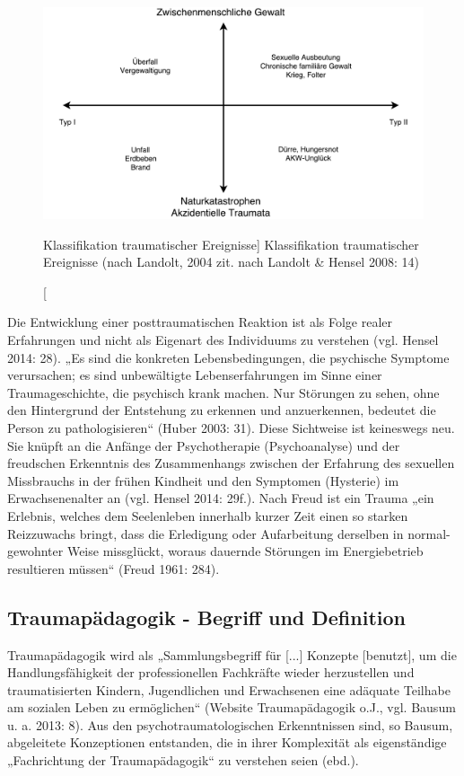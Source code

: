 \begin{figure}[h]
  \centering
  \includegraphics[scale=0.5]{abbildung1}
  \caption
      [Klassifikation traumatischer Ereignisse]
      {Klassifikation traumatischer Ereignisse (nach Landolt, 2004 zit. nach Landolt \& Hensel 2008: 14)}
\end{figure}

Die Entwicklung einer posttraumatischen Reaktion ist als Folge realer Erfahrungen und nicht als Eigenart des Individuums zu verstehen (vgl. Hensel 2014: 28). „Es sind die konkreten Lebensbedingungen, die psychische Symptome verursachen; es sind unbewältigte Lebenserfahrungen im Sinne einer Traumageschichte, die psychisch krank machen. Nur Störungen zu sehen, ohne den Hintergrund der Entstehung zu erkennen und anzuerkennen, bedeutet die Person zu pathologisieren“ (Huber 2003: 31). Diese Sichtweise ist keineswegs neu. Sie knüpft an die Anfänge der Psychotherapie (Psychoanalyse) und der freudschen Erkenntnis des Zusammenhangs zwischen der Erfahrung des sexuellen Missbrauchs in der frühen Kindheit und den Symptomen (Hysterie) im Erwachsenenalter an (vgl. Hensel 2014: 29f.). Nach Freud ist ein Trauma „ein Erlebnis, welches dem Seelenleben innerhalb kurzer Zeit einen so starken Reizzuwachs bringt, dass die Erledigung oder Aufarbeitung derselben in normal-gewohnter Weise missglückt, woraus dauernde Störungen im Energiebetrieb resultieren müssen“ (Freud 1961: 284). 

\subsection{Traumapädagogik - Begriff und Definition}
Traumapädagogik wird als „Sammlungsbegriff für [...] Konzepte [benutzt], um die Handlungsfähigkeit der professionellen Fachkräfte wieder herzustellen und traumatisierten Kindern, Jugendlichen und Erwachsenen eine adäquate Teilhabe am sozialen Leben zu ermöglichen“ (Website Traumapädagogik o.J., vgl. Bausum u. a. 2013: 8). Aus den psychotraumatologischen Erkenntnissen sind, so Bausum, abgeleitete Konzeptionen entstanden, die in ihrer Komplexität als eigenständige „Fachrichtung der Traumapädagogik“ zu verstehen seien (ebd.).  

